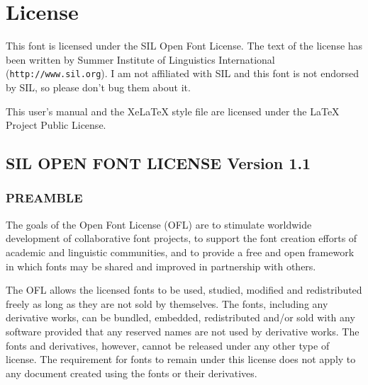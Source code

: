 \documentclass[a4paper, 12pt]{article}
\begin{document}
\newpage
\pagestyle{plain}

\nocite{cappelli}
\nocite{derolez}
\nocite{opentype}
\nocite{type1}
\nocite{carter}
\nocite{laurila}
\nocite{yonge}
\nocite{kpt_historia}
\nocite{rapola}
\nocite{hakkinen}
\nocite{gutenberg}
\nocite{carmina}
\nocite{horatius}
\nocite{suomalainen_kirjallisuus}
\nocite{legenda}
\nocite{kirjallinen_kulttuuri_keskiajan_suomessa}

\newpage





\newpage


\section{License}

This font is licensed under the SIL Open Font License. The text of the
license has been written by Summer Institute of Linguistics
International (\texttt{http://www.sil.org}). I am not affiliated with
SIL and this font is not endorsed by SIL, so please don't bug them
about it. 

This user's manual and the XeLaTeX style file are licensed under the
LaTeX Project Public License.

\subsection{SIL OPEN FONT LICENSE Version 1.1}

\label{pg_license}

\subsubsection{PREAMBLE}

The goals of the Open Font License (OFL) are to stimulate worldwide
development of collaborative font projects, to support the font
creation efforts of academic and linguistic communities, and to
provide a free and open framework in which fonts may be shared and
improved in partnership with others.

The OFL allows the licensed fonts to be used, studied, modified and
redistributed freely as long as they are not sold by themselves. The
fonts, including any derivative works, can be bundled, embedded, 
redistributed and/or sold with any software provided that any reserved
names are not used by derivative works. The fonts and derivatives,
however, cannot be released under any other type of license. The
requirement for fonts to remain under this license does not apply
to any document created using the fonts or their derivatives.
\end{document}
